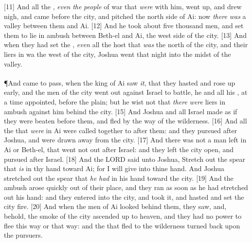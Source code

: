 [11] \textcolor[cmyk]{0.99998,1,0,0}{And all the , \emph{even} \emph{the} \emph{people} of war that \emph{were} with him, went up, and drew nigh, and came before the city, and pitched  the north side of Ai: now \emph{there} \emph{was} a valley between them and Ai.}
[12] \textcolor[cmyk]{0.99998,1,0,0}{And he took about five thousand men, and set them to lie in ambush between Beth-el and Ai,  the west side of the city.}
[13] \textcolor[cmyk]{0.99998,1,0,0}{And when they had set the , \emph{even} all the host that \emph{was}  the north of the city, and their liers in wa  the west of the city, Joshua went that night into the midst of the valley.}\\
\\
\P \textcolor[cmyk]{0.99998,1,0,0}{And  came to pass, when the king of Ai saw \emph{it}, that they hasted and rose up early, and the men of the city went out against Israel to battle, he and all his , at a time appointed, before the plain; but he wist not that \emph{there} \emph{were} liers in ambush against him behind the city.}
[15] \textcolor[cmyk]{0.99998,1,0,0}{And Joshua and all Israel made as if they were beaten before them, and fled by the way of the wilderness.}
[16] \textcolor[cmyk]{0.99998,1,0,0}{And all the  that \emph{were} in Ai were called together to  after them: and they pursued after Joshua, and were drawn away from the city.}
[17] \textcolor[cmyk]{0.99998,1,0,0}{And there was not a man left in Ai or Beth-el, that went not out after Israel: and they left the city open, and pursued after Israel.}
[18] \textcolor[cmyk]{0.99998,1,0,0}{And the LORD said unto Joshua, Stretch out the spear that \emph{is} in thy hand toward Ai; for I will give  into thine hand. And Joshua stretched out the spear that \emph{he} \emph{had} in his hand toward the city.}
[19] \textcolor[cmyk]{0.99998,1,0,0}{And the ambush arose quickly out of their place, and they ran as soon as he had stretched out his hand: and they entered into the city, and took it, and hasted and set the city  fire.}
[20] \textcolor[cmyk]{0.99998,1,0,0}{And when the men of Ai looked behind them, they saw, and, behold, the smoke of the city ascended up to heaven, and they had no power to flee this way or that way: and the  that fled to the wilderness turned back upon the pursuers.}
